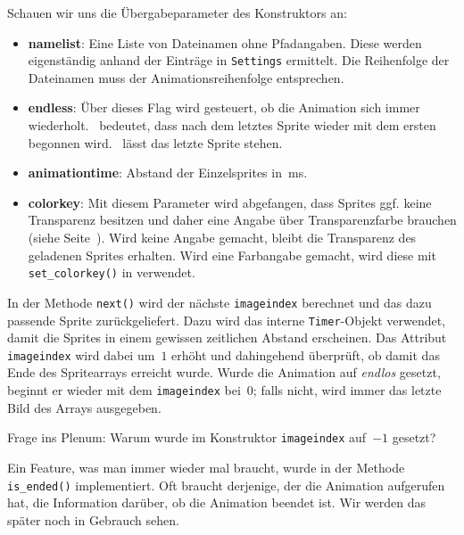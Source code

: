 Schauen wir uns die Übergabeparameter des Konstruktors an: 
\begin{itemize}
    \item \textbf{namelist}: Eine Liste von Dateinamen ohne Pfadangaben. Diese werden eigenständig anhand der Einträge in \texttt{Settings} ermittelt. Die Reihenfolge der Dateinamen muss der Animationsreihenfolge entsprechen.

    \item \textbf{endless}: Über dieses Flag wird gesteuert, ob die Animation sich immer wiederholt. \true\ bedeutet, dass nach dem letztes Sprite wieder mit dem ersten begonnen wird. \false\ lässt das letzte Sprite stehen.

    \item \textbf{animationtime}: Abstand der Einzelsprites in~\unit{ms}.

    \item \textbf{colorkey}: Mit diesem Parameter wird abgefangen, dass Sprites ggf. keine Transparenz besitzen und daher eine Angabe über Transparenzfarbe brauchen (siehe Seite~\pageref{pageTransparenz}). Wird keine Angabe gemacht, bleibt die Transparenz des geladenen Sprites erhalten. Wird eine Farbangabe gemacht, wird diese mit \texttt{set\_colorkey()} in  verwendet.
\end{itemize}

In der Methode \texttt{next()} wird der nächste \texttt{imageindex} berechnet und das dazu passende Sprite zurückgeliefert. Dazu wird das interne \texttt{Timer}-Objekt verwendet, damit die Sprites in einem gewissen zeitlichen Abstand erscheinen. Das Attribut \texttt{imageindex} wird dabei um~$1$ erhöht und dahingehend überprüft, ob damit das Ende des Spritearrays erreicht wurde. Wurde die Animation auf \emph{endlos} gesetzt, beginnt er wieder mit dem \texttt{imageindex} bei~$0$; falls nicht, wird immer das letzte Bild des Arrays ausgegeben.

Frage ins Plenum: Warum wurde im Konstruktor \texttt{imageindex} auf~$-1$ gesetzt?

Ein Feature, was man immer wieder mal braucht, wurde in der Methode \texttt{is\_ended()} implementiert. Oft braucht derjenige, der die Animation aufgerufen hat, die Information darüber, ob die Animation beendet ist. Wir werden das später noch in Gebrauch sehen.



